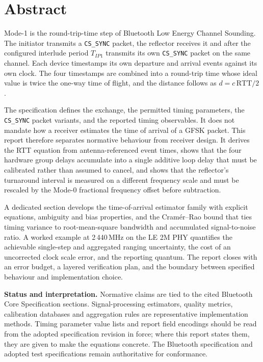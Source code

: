 \documentclass[11pt,a4paper]{article}
\newcommand{\RTT}{\mathrm{RTT}}
\newcommand{\Tip}{T_{IP1}}
\newcommand{\code}[1]{\texttt{\small #1}}
\begin{document}
\newpage
{}

\section*{Abstract}

Mode-1 is the round-trip-time step of Bluetooth Low Energy Channel Sounding. The initiator
transmits a \code{CS\_SYNC} packet, the reflector receives it and after the configured interlude
period $\Tip$ transmits its own \code{CS\_SYNC} packet on the same channel. Each device
timestamps its own departure and arrival events against its own clock. The four timestamps are
combined into a round-trip time whose ideal value is twice the one-way time of flight, and the
distance follows as $d = c\,\RTT/2$.

The specification defines the exchange, the permitted timing parameters, the \code{CS\_SYNC}
packet variants, and the reported timing observables. It does not mandate how a receiver
estimates the time of arrival of a GFSK packet. This report therefore separates normative
behaviour from receiver design. It derives the RTT equation from antenna-referenced event times,
shows that the four hardware group delays accumulate into a single additive loop delay that must
be calibrated rather than assumed to cancel, and shows that the reflector's turnaround interval
is measured on a different frequency scale and must be rescaled by the Mode-0 fractional
frequency offset before subtraction.

A dedicated section develops the time-of-arrival estimator family with explicit equations,
ambiguity and bias properties, and the Cram\'er--Rao bound that ties timing variance to
root-mean-square bandwidth and accumulated signal-to-noise ratio. A worked example at
2\,440\,MHz on the LE 2M PHY quantifies the achievable single-step and aggregated ranging
uncertainty, the cost of an uncorrected clock scale error, and the reporting quantum. The report
closes with an error budget, a layered verification plan, and the boundary between specified
behaviour and implementation choice.

\begin{callout}
\textbf{Status and interpretation.} Normative claims are tied to the cited Bluetooth Core
Specification sections. Signal-processing estimators, quality metrics, calibration databases and
aggregation rules are representative implementation methods. Timing parameter value lists and
report field encodings should be read from the adopted specification revision in force; where
this report states them, they are given to make the equations concrete. The Bluetooth
specification and adopted test specifications remain authoritative for conformance.
\end{callout}
\end{document}
